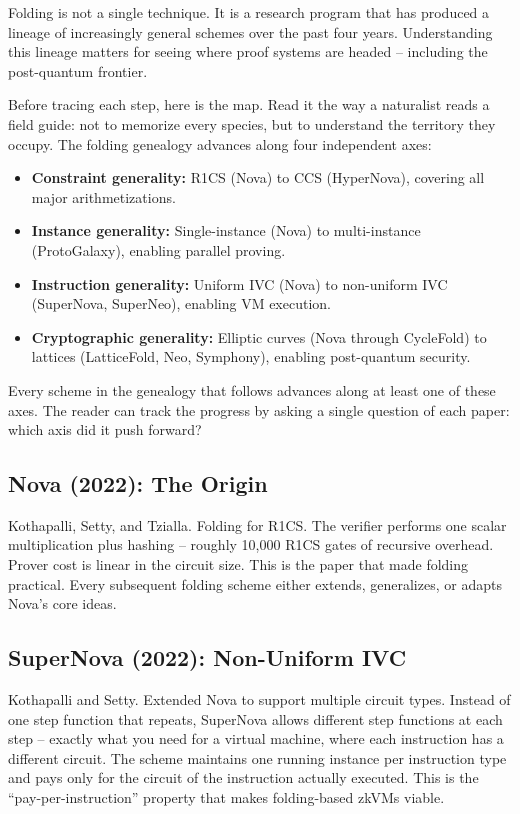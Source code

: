 \documentclass[
  11pt,
  openany]{report}
\providecommand{\tightlist}{%
  \setlength{\itemsep}{0pt}\setlength{\parskip}{0pt}}
\renewcommand{\textbf}[1]{{\bfseries\color{MidnightBold}#1}}
\begin{document}
Folding is not a single technique. It is a research program that has produced a
lineage of increasingly general schemes over the past four years. Understanding
this lineage matters for seeing where proof systems are headed -- including the
post-quantum frontier.

Before tracing each step, here is the map. Read it the way a naturalist reads a
field guide: not to memorize every species, but to understand the territory they
occupy. The folding genealogy advances along four independent axes:

\begin{itemize}
\tightlist
\item
  \textbf{Constraint generality:} R1CS (Nova) to CCS (HyperNova), covering all
  major arithmetizations.
\item
  \textbf{Instance generality:} Single-instance (Nova) to multi-instance
  (ProtoGalaxy), enabling parallel proving.
\item
  \textbf{Instruction generality:} Uniform IVC (Nova) to non-uniform IVC
  (SuperNova, SuperNeo), enabling VM execution.
\item
  \textbf{Cryptographic generality:} Elliptic curves (Nova through CycleFold) to
  lattices (LatticeFold, Neo, Symphony), enabling post-quantum security.
\end{itemize}

Every scheme in the genealogy that follows advances along at least one of these
axes. The reader can track the progress by asking a single question of each
paper: which axis did it push forward?

\subsection{Nova (2022): The Origin}\label{nova-2022-the-origin}

Kothapalli, Setty, and Tzialla. Folding for R1CS. The verifier performs one
scalar multiplication plus hashing -- roughly 10,000 R1CS gates of recursive
overhead. Prover cost is linear in the circuit size. This is the paper that made
folding practical. Every subsequent folding scheme either extends, generalizes,
or adapts Nova's core ideas.

\subsection{SuperNova (2022): Non-Uniform
IVC}\label{supernova-2022-non-uniform-ivc}

Kothapalli and Setty. Extended Nova to support multiple circuit types. Instead
of one step function that repeats, SuperNova allows different step functions at
each step -- exactly what you need for a virtual machine, where each instruction
has a different circuit. The scheme maintains one running instance per
instruction type and pays only for the circuit of the instruction actually
executed. This is the ``pay-per-instruction'' property that makes folding-based
zkVMs viable.
\end{document}
